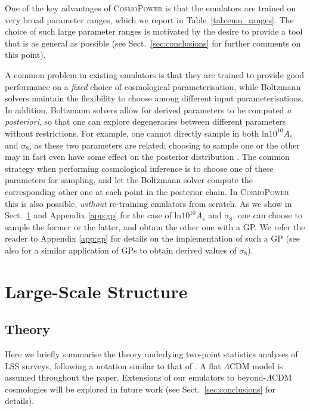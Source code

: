 \documentclass[fleqn,usenatbib]{mnras}
\begin{document}
One of the key advantages of \textsc{CosmoPower} is that the emulators are trained on very broad parameter ranges, which we report in Table~\ref{tab:emu_ranges}. The choice of such large parameter ranges is motivated by the desire to provide a tool that is as general as possible (see Sect.~\ref{sec:conclusions} for further comments on this point). 

A common problem in existing emulators is that they are trained to provide good performance on a \textit{fixed} choice of cosmological parameterisation, while Boltzmann solvers maintain the flexibility to choose among different input parameterisations. In addition, Boltzmann solvers allow for derived parameters to be computed \textit{a posteriori}, so that one can explore degeneracies between different parameters without restrictions. For example, one cannot directly sample in both $\mathrm{ln} 10^{10} A_{\mathrm{s}}$ and $\sigma_8$, as these two parameters are related; choosing to sample one or the other may in fact even have some effect on the posterior distribution \citep[see e.g.][]{Joachimi20}. The common strategy when performing cosmological inference is to choose one of these parameters for sampling, and let the Boltzmann solver compute the corresponding other one at each point in the posterior chain. In \textsc{CosmoPower} this is also possible, \textit{without} re-training emulators from scratch. As we show in Sect.~\ref{sec:LSS} and Appendix \ref{app:gp} for the case of $\mathrm{ln} 10^{10} A_s$ and $\sigma_8$, one can choose to sample the former or the latter, and obtain the other one with a GP. We refer the reader to Appendix \ref{app:gp} for details on the implementation of such a GP (see also \citealt{Mootoovaloo20} for a similar application of GPs to obtain derived values of $\sigma_8$).

\section{Large-Scale Structure}\label{sec:LSS}

\subsection{Theory}
Here we briefly summarise the theory underlying two-point statistics analyses of LSS surveys, following a notation similar to that of \citet{Asgari20, Heymans20, Joachimi20}. A flat $\Lambda$CDM model is assumed throughout the paper. Extensions of our emulators to beyond-$\Lambda$CDM cosmologies will be explored in future work (see Sect.~\ref{sec:conclusions} for details).
\end{document}
